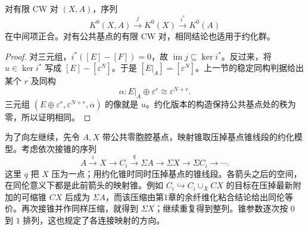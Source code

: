 \begin{proposition}\label{g2:prop:k-zero-exact}
	对有限 CW 对 \((X,A)\)，序列
	\[
		K^0(X,A)\xrightarrow{j}K^0(X)\xrightarrow{i^*}K^0(A)
	\]
	在中间项正合。对有公共基点的有限 CW 对，相同结论也适用于约化群。
\end{proposition}
\begin{proof}
	对三元组，\(i^*([E]-[F])=0\)，故 \(\operatorname{im}j\subseteq\ker i^*\)。反过来，将 \(u\in\ker i^*\) 写成 \([E]-[\varepsilon^N]\)。于是 \([E|_A]=[\varepsilon^N]\)。上一节的稳定同构判据给出某个 \(r\) 及同构
	\[
		\alpha:E|_A\oplus\varepsilon^r\cong\varepsilon^{N+r}.
	\]
	三元组 \((E\oplus\varepsilon^r,\varepsilon^{N+r},\alpha)\) 的像就是 \(u\)。约化版本的构造保持公共基点处的秩为零，所以证明相同。
\end{proof}

为了向左继续，先令 \(A,X\) 带公共零胞腔基点，映射锥取压掉基点锥线段的约化模型。考虑依次接锥的序列
\begin{equation}\label{g2:eq:k-puppe-spaces}
	A\xrightarrow{i}X\longrightarrow C_i\xrightarrow{q}\Sigma A
	\longrightarrow\Sigma X\longrightarrow\Sigma C_i\longrightarrow\cdots.
\end{equation}
这里 \(q\) 把 \(X\) 压为一点；用约化锥时同时压掉基点的锥线段。各箭头之后的空间，在同伦意义下都是此前箭头的映射锥。例如 \(C_i\hookrightarrow C_i\cup_X CX\) 的目标在压掉最新附加的可缩锥 \(CX\) 后成为 \(\Sigma A\)，而该压缩由第1章的余纤维化粘合结论给出同伦等价。再次接锥并作同样压缩，就得到 \(\Sigma X\)；继续重复得到整列。锥参数逐次按 \(0\) 到 \(1\) 排列，这也规定了各连接映射的方向。

